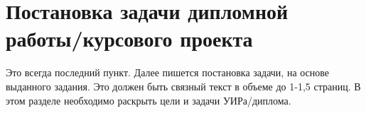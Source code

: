 \section{Постановка задачи дипломной работы/курсового проекта}

Это всегда последний пункт. Далее пишется постановка задачи, на основе выданного задания. Это должен быть связный текст в объеме до 1-1,5 страниц. В этом разделе необходимо раскрыть цели и задачи УИРа/диплома. 

